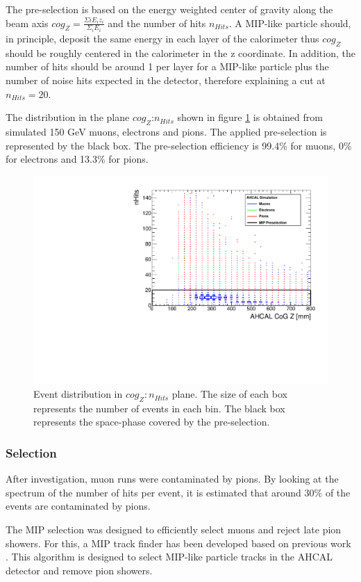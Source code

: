 The pre-selection is based on the energy weighted center of gravity along the beam axis $cog_Z = \frac{\Sigma{i} E_i z_i}{\Sigma_{i} E_i}$ and the number of hits $n_{Hits}$. A MIP-like particle should, in principle, deposit the same energy in each layer of the calorimeter thus $cog_Z$ should be roughly centered in the calorimeter in the z coordinate. In addition, the number of hits should be around 1 per layer for a MIP-like particle plus the number of noise hits expected in the detector, therefore explaining a cut at $n_{Hits} = 20$.

The distribution in the plane $cog_Z$:$n_{Hits}$ shown in figure \ref{fig:Muons_CoGZ_nHits} is obtained from simulated 150 GeV muons, electrons and pions. The applied pre-selection is represented by the black box. The pre-selection efficiency is 99.4\% for muons, 0\% for electrons and 13.3\% for pions.

\begin{figure}[htbp!]
	\centering
	\includegraphics[width=0.7\linewidth]{../Thesis_Plots/Timing/Muons/Plots/SelectionCut_nHitsCoGZ_Muons}
	\caption{Event distribution in $cog_Z:n_{Hits}$ plane. The size of each box represents the number of events in each bin. The black box represents the space-phase covered by the pre-selection.} \label{fig:Muons_CoGZ_nHits}
\end{figure}

\subsubsection{Selection}
\label{subsec:Muon_sel}

After investigation, muon runs were contaminated by pions. By looking at the spectrum of the number of hits per event, it is estimated that around 30\% of the events are contaminated by pions.

The MIP selection was designed to efficiently select muons and reject late pion showers. For this, a MIP track finder has been developed based on previous work \cite{Hartbrich:2016bbz}. This algorithm is designed to select MIP-like particle tracks in the AHCAL detector and remove pion showers.

